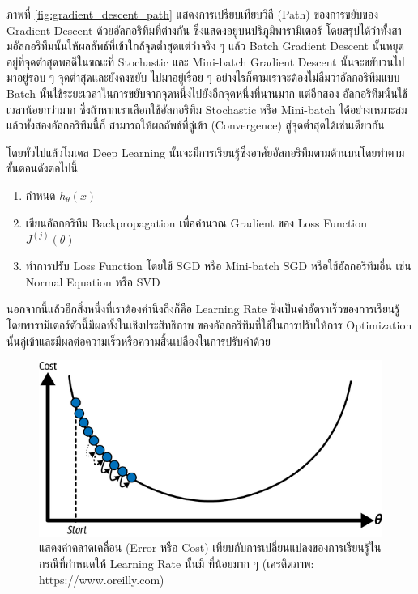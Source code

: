 ภาพที่ \ref{fig:gradient_descent_path} แสดงการเปรียบเทียบวิถี (Path) ของการขยับของ Gradient Descent ด้วยอัลกอริทึมที่ต่างกัน
ซึ่งแสดงอยู่บนปริภูมิพารามิเตอร์ โดยสรุปได้ว่าทั้งสามอัลกอริทึมนั้นให้ผลลัพธ์ที่เข้าใกล้จุดต่ำสุดแต่ว่าจริง ๆ แล้ว Batch Gradient Descent
นั้นหยุดอยู่ที่จุดต่ำสุดพอดีในขณะที่ Stochastic และ Mini-batch Gradient Descent นั้นจะขยับวนไปมาอยู่รอบ ๆ จุดต่ำสุดและยังคงขยับ%
ไปมาอยู่เรื่อย ๆ อย่างไรก็ตามเราจะต้องไม่ลืมว่าอัลกอริทึมแบบ Batch นั้นใช้ระยะเวลาในการขยับจากจุดหนึ่งไปยังอีกจุดหนึ่งที่นานมาก แต่อีกสอง%
อัลกอริทึมนั้นใช้เวลาน้อยกว่ามาก ซึ่งถ้าหากเราเลือกใช้อัลกอริทึม Stochastic หรือ Mini-batch ได้อย่างเหมาะสมแล้วทั้งสองอัลกอริทึมนี้ก็%
สามารถให้ผลลัพธ์ที่ลู่เข้า (Convergence) สู่จุดต่ำสุดได้เช่นเดียวกัน

โดยทั่วไปแล้วโมเดล Deep Learning นั้นจะมีการเรียนรู้ซึ่งอาศัยอัลกอริทึมตามด้านบนโดยทำตามขั้นตอนดังต่อไปนี้

\begin{enumerate}[topsep=0pt,noitemsep]
    \item กำหนด $h_\theta(x)$

    \item เขียนอัลกอริทึม Backpropagation เพื่อคำนวณ Gradient ของ Loss Function $J^{(j)}(\theta)$

    \item ทำการปรับ Loss Function โดยใช้ SGD หรือ Mini-batch SGD หรือใช้อัลกอริทึมอื่น เช่น Normal Equation หรือ SVD
\end{enumerate}

นอกจากนี้แล้วอีกสิ่งหนึ่งที่เราต้องคำนึงถึงก็คือ Learning Rate ซึ่งเป็นค่าอัตราเร็วของการเรียนรู้ โดยพารามิเตอร์ตัวนี้มีผลทั้งในเชิงประสิทธิภาพ%
ของอัลกอริทึมที่ใช้ในการปรับให้การ Optimization นั้นลู่เข้าและมีผลต่อความเร็วหรือความสิ้นเปลืองในการปรับค่าด้วย

\begin{figure}[H]
    \centering
    \includegraphics[width=0.8\linewidth]{fig/learning_rate_small.png}
    \caption{แสดงค่าคลาดเคลื่อน (Error หรือ Cost) เทียบกับการเปลี่ยนแปลงของการเรียนรู้ในกรณีที่กำหนดให้ Learning Rate นั้นมี%
        ที่น้อยมาก ๆ (เครดิตภาพ: https://www.oreilly.com)}
    \label{fig:learning_rate_small}
\end{figure}


